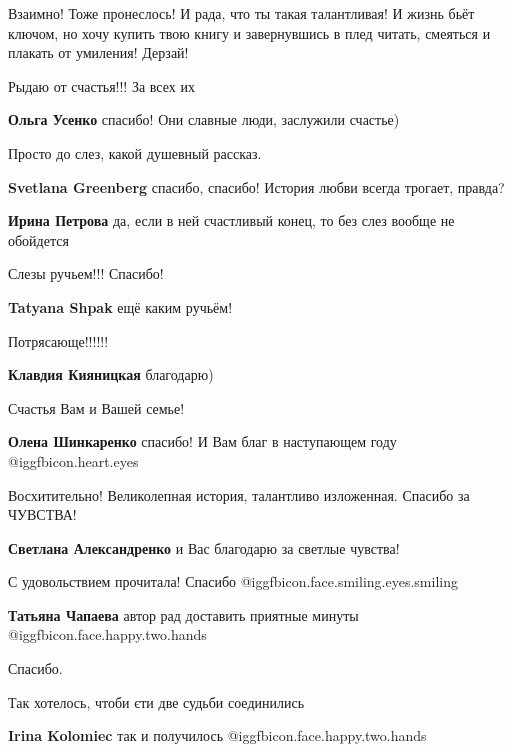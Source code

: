 \begin{itemize}
\begin{itemize}
Взаимно! Тоже пронеслось! И рада, что ты такая талантливая! И жизнь бьёт
ключом, но хочу купить твою книгу и завернувшись в плед читать, смеяться и
плакать от умиления! Дерзай!

\end{itemize} %

Рыдаю от счастья!!! За всех их

\textbf{Ольга Усенко} спасибо! Они славные люди, заслужили счастье)

Просто до слез, какой душевный рассказ.

\begin{itemize} %
\textbf{Svetlana Greenberg} спасибо, спасибо! История любви всегда трогает, правда?

\textbf{Ирина Петрова} да, если в ней счастливый конец, то без слез вообще не обойдется
\end{itemize} %

Слезы ручьем!!!
Спасибо!

\textbf{Tatyana Shpak} ещё каким ручьём!

Потрясающе!!!!!!

\textbf{Клавдия Кияницкая} благодарю)

Счастья Вам и Вашей семье!

\textbf{Олена Шинкаренко} спасибо! И Вам благ в наступающем году @igg{fbicon.heart.eyes} 

Восхитительно! Великолепная история, талантливо изложенная. Спасибо за ЧУВСТВА!

\textbf{Светлана Александренко} и Вас благодарю за светлые чувства!

С удовольствием прочитала! Спасибо  @igg{fbicon.face.smiling.eyes.smiling} 

\textbf{Татьяна Чапаева} автор рад доставить приятные минуты @igg{fbicon.face.happy.two.hands} 

Спасибо.

Так хотелось, чтоби єти две судьби соединились

\begin{itemize} %
\textbf{Irina Kolomiec} так и получилось  @igg{fbicon.face.happy.two.hands} 


\end{itemize}
\end{itemize}
